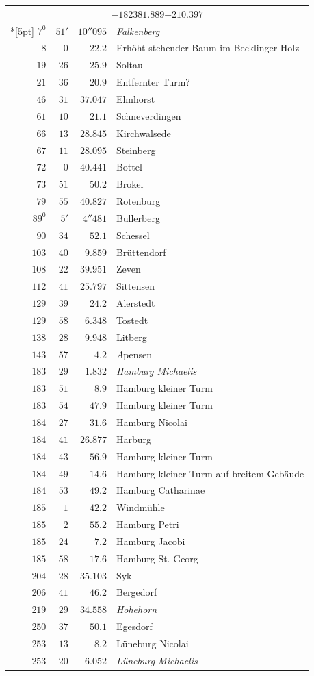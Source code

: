 \begin{longtable}{@{}rrrp{.61\linewidth}@{}}
\multicolumn{4}{c}{\(-182381.889\)\qquad\(+210.397\)}\\*[5pt]
\(7^{0}\)&\(51'\)&\(10''095\)&\raggedright \textit{Falkenberg}\tabularnewline
\(8\)&\(0\)&\(22.2\)&\raggedright Erhöht stehender Baum im Becklinger Holz\tabularnewline
\(19\)&\(26\)&\(25.9\)&\raggedright Soltau\tabularnewline
\(21\)&\(36\)&\(20.9\)&\raggedright Entfernter Turm?\tabularnewline
\(46\)&\(31\)&\(37.047\)&\raggedright Elmhorst\tabularnewline
\(61\)&\(10\)&\(21.1\)&\raggedright Schneverdingen\tabularnewline
\(66\)&\(13\)&\(28.845\)&\raggedright Kirchwalsede\tabularnewline
\(67\)&\(11\)&\(28.095\)&\raggedright Steinberg\tabularnewline
\(72\)&\(0\)&\(40.441\)&\raggedright Bottel\tabularnewline
\(73\)&\(51\)&\(50.2\)&\raggedright Brokel\tabularnewline
\(79\)&\(55\)&\(40.827\)&\raggedright Rotenburg\tabularnewline
\(89^{0}\)&\(5'\)&\(4''481\)&\raggedright Bullerberg\tabularnewline
\(90\)&\(34\)&\(52.1\)&\raggedright Schessel\tabularnewline
\(103\)&\(40\)&\(9.859\)&\raggedright Brüttendorf\tabularnewline
\(108\)&\(22\)&\(39.951\)&\raggedright Zeven\tabularnewline
\(112\)&\(41\)&\(25.797\)&\raggedright Sittensen\tabularnewline
\(129\)&\(39\)&\(24.2\)&\raggedright Alerstedt\tabularnewline
\(129\)&\(58\)&\(6.348\)&\raggedright Tostedt\tabularnewline
\(138\)&\(28\)&\(9.948\)&\raggedright Litberg\tabularnewline
\(143\)&\(57\)&\(4.2\)&\raggedright \textit{A}pensen\tabularnewline
\(183\)&\(29\)&\(1.832\)&\raggedright \textit{Hamburg Michaelis}\tabularnewline
\(183\)&\(51\)&\(8.9\)&\raggedright Hamburg kleiner Turm\tabularnewline
\(183\)&\(54\)&\(47.9\)&\raggedright Hamburg kleiner Turm\tabularnewline
\(184\)&\(27\)&\(31.6\)&\raggedright Hamburg Nicolai\tabularnewline
\(184\)&\(41\)&\(26.877\)&\raggedright Harburg\tabularnewline
\(184\)&\(43\)&\(56.9\)&\raggedright Hamburg kleiner Turm\tabularnewline
\(184\)&\(49\)&\(14.6\)&\raggedright Hamburg kleiner Turm auf breitem Gebäude\tabularnewline
\(184\)&\(53\)&\(49.2\)&\raggedright Hamburg Catharinae\tabularnewline
\(185\)&\(1\)&\(42.2\)&\raggedright Windmühle\tabularnewline
\(185\)&\(2\)&\(55.2\)&\raggedright Hamburg Petri\tabularnewline
\(185\)&\(24\)&\(7.2\)&\raggedright Hamburg Jacobi\tabularnewline
\(185\)&\(58\)&\(17.6\)&\raggedright Hamburg St. Georg\tabularnewline
\(204\)&\(28\)&\(35.103\)&\raggedright Syk\tabularnewline
\(206\)&\(41\)&\(46.2\)&\raggedright Bergedorf\tabularnewline
\(219\)&\(29\)&\(34.558\)&\raggedright \textit{Hohehorn}\tabularnewline
\(250\)&\(37\)&\(50.1\)&\raggedright Egesdorf\tabularnewline
\(253\)&\(13\)&\(8.2\)&\raggedright Lüneburg Nicolai\tabularnewline
\(253\)&\(20\)&\(6.052\)&\raggedright \textit{Lüneburg Michaelis}\tabularnewline

\end{longtable}
